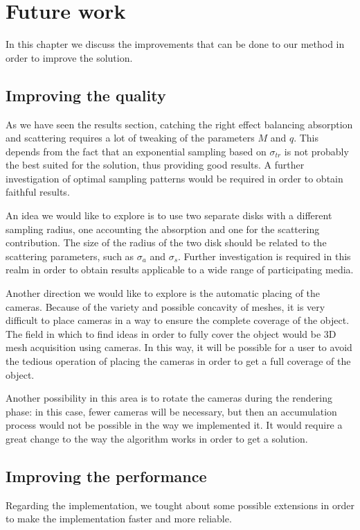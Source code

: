\chapter{Future work}
\label{chap:futurework}

In this chapter we discuss the improvements that can be done to our method in order to improve the solution.

\section{Improving the quality}

As we have seen the results section, catching the right effect balancing absorption and scattering requires a lot of tweaking of the parameters $M$ and $q$. This depends from the fact that an exponential sampling based on $\sigma_{tr}$ is not probably the best suited for the solution, thus providing good results. A further investigation of optimal sampling patterns would be required in order to obtain faithful results.

An idea we would like to explore is to use two separate disks with a different sampling radius, one accounting the absorption and one for the scattering contribution. The size of the radius of the two disk should be related to the scattering parameters, such as $\sigma_a$ and $\sigma_s$. Further investigation is required in this realm in order to obtain results applicable to a wide range of participating media.

Another direction we would like to explore is the automatic placing of the cameras. Because of the variety and possible concavity of meshes, it is very difficult to place cameras in a way to ensure the complete coverage of the object. The field in which to find ideas in order to fully cover the object would be 3D mesh acquisition using cameras. In this way, it will be possible for a user to avoid the tedious operation of placing the cameras in order to get a full coverage of the object. 

Another possibility in this area is to rotate the cameras during the rendering phase: in this case, fewer cameras will be necessary, but then an accumulation process would not be possible in the way we implemented it. It would require a great change to the way the algorithm works in order to get a solution.

\section{Improving the performance}
Regarding the implementation, we tought about some possible extensions in order to make the implementation faster and more reliable.

